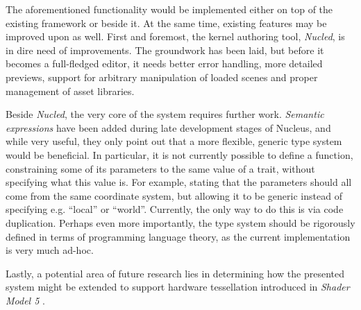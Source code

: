 The aforementioned functionality would be implemented either on top of the existing framework or beside it. At the same time, existing features may be improved upon as well. First and foremost, the kernel authoring tool, \emph{Nucled}, is in dire need of improvements. The groundwork has been laid, but before it becomes a full-fledged editor, it needs better error handling, more detailed previews, support for arbitrary manipulation of loaded scenes and proper management of asset libraries.

Beside \emph{Nucled}, the very core of the system requires further work. \emph{Semantic expressions} have been added during late development stages of Nucleus, and while very useful, they only point out that a more flexible, generic type system would be beneficial. In particular, it is not currently possible to define a function, constraining some of its parameters to the same value of a trait, without specifying what this value is. For example, stating that the parameters should all come from the same coordinate system, but allowing it to be generic instead of specifying e.g. ``local'' or ``world''. Currently, the only way to do this is via code duplication. Perhaps even more importantly, the type system should be rigorously defined in terms of programming language theory, as the current implementation is very much ad-hoc.

Lastly, a potential area of future research lies in determining how the presented system might be extended to support hardware tessellation introduced in \emph{Shader Model 5} \cite{SM5}.
